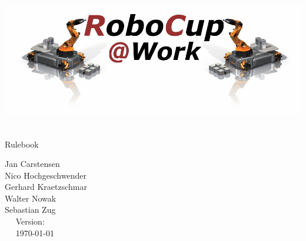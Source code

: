 \begin{titlepage}
  \begin{center}
    {
      
      \includegraphics[width=\textwidth]{images/logo_RoboCupAtWork.pdf}\\[1.23ex]
    }
    \vspace{2.7 cm}
    \hrulefill\par
    {%
      \vspace*{.27cm}
      \Huge{\RCAW}\\[1.23ex]
      \Large Rulebook \\[2ex]
    }
    



    \hrulefill\par
    
    \vfill

    
	Jan Carstensen\\
	Nico Hochgeschwender\\
	Gerhard Kraetzschmar\\
	Walter Nowak\\
	Sebastian Zug\\
    
    \vfill
    ~~ Version: \YEAR ~~ \\
    ~~  \today ~~ \\
  \end{center}
\end{titlepage}
